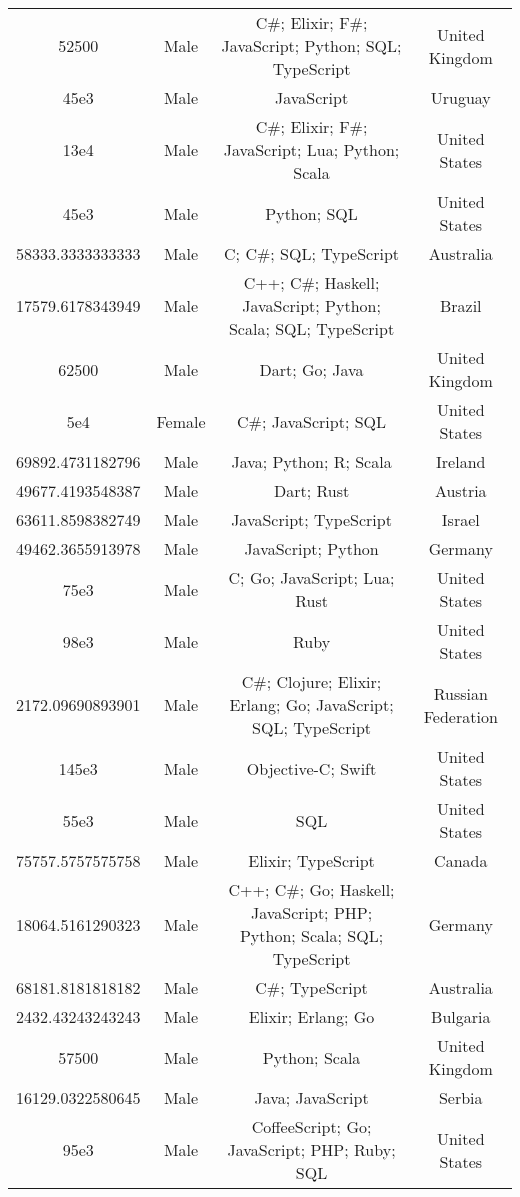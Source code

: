 \begin{center}
\begin{tabular}{ |c|c|c|c| }
52500  &  Male  &  C\#; Elixir; F\#; JavaScript; Python; SQL; TypeScript  &  United Kingdom  \\ 
45e3  &  Male  &  JavaScript  &  Uruguay  \\ 
13e4  &  Male  &  C\#; Elixir; F\#; JavaScript; Lua; Python; Scala  &  United States  \\ 
45e3  &  Male  &  Python; SQL  &  United States  \\ 
58333.3333333333  &  Male  &  C; C\#; SQL; TypeScript  &  Australia  \\ 
17579.6178343949  &  Male  &  C++; C\#; Haskell; JavaScript; Python; Scala; SQL; TypeScript  &  Brazil  \\ 
62500  &  Male  &  Dart; Go; Java  &  United Kingdom  \\ 
5e4  &  Female  &  C\#; JavaScript; SQL  &  United States  \\ 
69892.4731182796  &  Male  &  Java; Python; R; Scala  &  Ireland  \\ 
49677.4193548387  &  Male  &  Dart; Rust  &  Austria  \\ 
63611.8598382749  &  Male  &  JavaScript; TypeScript  &  Israel  \\ 
49462.3655913978  &  Male  &  JavaScript; Python  &  Germany  \\ 
75e3  &  Male  &  C; Go; JavaScript; Lua; Rust  &  United States  \\ 
98e3  &  Male  &  Ruby  &  United States  \\ 
2172.09690893901  &  Male  &  C\#; Clojure; Elixir; Erlang; Go; JavaScript; SQL; TypeScript  &  Russian Federation  \\ 
145e3  &  Male  &  Objective-C; Swift  &  United States  \\ 
55e3  &  Male  &  SQL  &  United States  \\ 
75757.5757575758  &  Male  &  Elixir; TypeScript  &  Canada  \\ 
18064.5161290323  &  Male  &  C++; C\#; Go; Haskell; JavaScript; PHP; Python; Scala; SQL; TypeScript  &  Germany  \\ 
68181.8181818182  &  Male  &  C\#; TypeScript  &  Australia  \\ 
2432.43243243243  &  Male  &  Elixir; Erlang; Go  &  Bulgaria  \\ 
57500  &  Male  &  Python; Scala  &  United Kingdom  \\ 
16129.0322580645  &  Male  &  Java; JavaScript  &  Serbia  \\ 
95e3  &  Male  &  CoffeeScript; Go; JavaScript; PHP; Ruby; SQL  &  United States  \\ 

\end{tabular}
\end{center}
